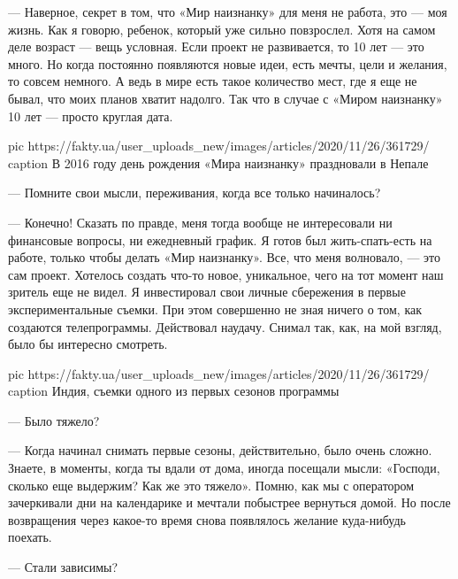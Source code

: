 --- Наверное, секрет в том, что «Мир наизнанку» для меня не работа, это --- моя
жизнь. Как я говорю, ребенок, который уже сильно повзрослел. Хотя на самом деле
возраст --- вещь условная. Если проект не развивается, то 10 лет --- это много. Но
когда постоянно появляются новые идеи, есть мечты, цели и желания, то совсем
немного. А ведь в мире есть такое количество мест, где я еще не бывал, что моих
планов хватит надолго. Так что в случае с «Миром наизнанку» 10 лет --- просто
круглая дата.

\ifcmt
pic https://fakty.ua/user_uploads_new/images/articles/2020/11/26/361729/%
caption В 2016 году день рождения «Мира наизнанку» праздновали в Непале
\fi


--- Помните свои мысли, переживания, когда все только начиналось?

--- Конечно! Сказать по правде, меня тогда вообще не интересовали ни финансовые
вопросы, ни ежедневный график. Я готов был жить-спать-есть на работе, только
чтобы делать «Мир наизнанку». Все, что меня волновало, --- это сам проект.
Хотелось создать что-то новое, уникальное, чего на тот момент наш зритель еще
не видел. Я инвестировал свои личные сбережения в первые экспериментальные
съемки. При этом совершенно не зная ничего о том, как создаются телепрограммы.
Действовал наудачу. Снимал так, как, на мой взгляд, было бы интересно смотреть.

\ifcmt
pic https://fakty.ua/user_uploads_new/images/articles/2020/11/26/361729/%
caption Индия, съемки одного из первых сезонов программы
\fi

--- Было тяжело?

--- Когда начинал снимать первые сезоны, действительно, было очень сложно.
Знаете, в моменты, когда ты вдали от дома, иногда посещали мысли:
«Господи, сколько еще выдержим? Как же это тяжело». Помню, как
мы с оператором зачеркивали дни на календарике и мечтали побыстрее
вернуться домой. Но после возвращения через какое-то время снова
появлялось желание куда-нибудь поехать.

--- Стали зависимы?

